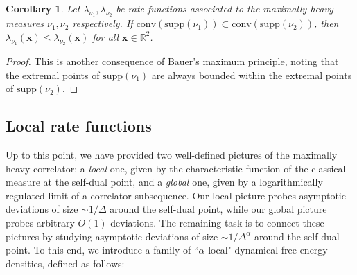 \documentclass[a4paper,11pt]{article}
\theoremstyle{plain}
\newtheorem{cor}{Corollary}
\theoremstyle{definition}
\theoremstyle{remark}
\newcommand{\bs}[1]{\boldsymbol{#1}}
\newcommand{\De}{\Delta}
\begin{document}
\begin{cor} 
\label{corollaryofcohstateratefunction}
Let $\lambda_{\nu_1},\lambda_{\nu_2}$ be rate functions associated to the maximally heavy measures $\nu_1,\nu_2$ respectively. If $\mathrm{conv}(\mathrm{supp}(\nu_1) )\subset \mathrm{conv}(\mathrm{supp}(\nu_2) )$, then $\lambda_{\nu_1}(\bs{x}) \leq \lambda_{\nu_2}(\bs{x})$ for all $\bs{x} \in \mathbb{R}^2$. 
\end{cor}
\begin{proof}
This is another consequence of Bauer's maximum principle, noting that the extremal points of $\mathrm{supp}(\nu_1) $ are always bounded within the extremal points of $\mathrm{supp}(\nu_2) $.
\end{proof}


\subsection{Local rate functions}
\label{localratefunctions}

Up to this point, we have provided two well-defined pictures of the maximally heavy correlator: a \textit{local} one, given by the characteristic function of the classical measure at the self-dual point, and a \textit{global} one, given by a logarithmically regulated limit of a correlator subsequence. Our local picture probes asymptotic deviations of size $\sim1/\De$ around the self-dual point, while our global picture probes arbitrary $O(1)$ deviations. The remaining task is to connect these pictures by studying asymptotic deviations of size $\sim 1/\De^{\alpha}$ around the self-dual point. To this end, we introduce a family of ``$\alpha$-local" dynamical free energy densities, defined as follows:
\end{document}
